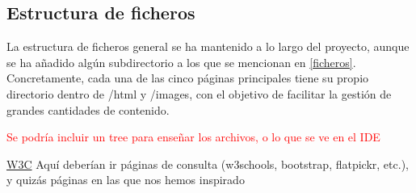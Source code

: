 \documentclass[11pt, a4paper]{book}
\begin{document}
	
	\subsection{Estructura de ficheros}
	La estructura de ficheros general se ha mantenido a lo largo del proyecto, aunque se ha añadido algún subdirectorio a los que se mencionan en \ref{ficheros}. Concretamente, cada una de las cinco páginas principales tiene su propio directorio dentro de /html y /images, con el objetivo de facilitar la gestión de grandes cantidades de contenido.
	
	\begin{huge}
		\textcolor{red}{Se podría incluir un tree para enseñar los archivos, o lo que se ve en el IDE}
	\end{huge}
	
	
	
	\begin{thebibliography}{widestlabel}
		\href{https://html.spec.whatwg.org/multipage/}{W3C}
		Aquí deberían ir páginas de consulta (w3schools, bootstrap, flatpickr, etc.), y quizás páginas en las que nos hemos inspirado
	\end{thebibliography}
	
	
	
\end{document}
